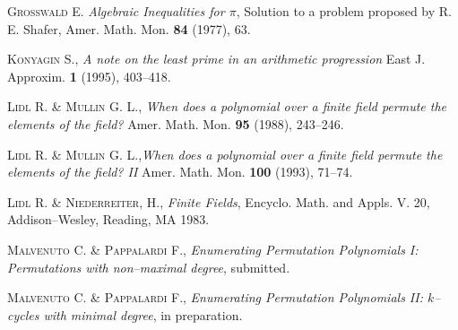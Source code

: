 \documentclass{amsart}
\begin{document}
    \begin{thebibliography}{99}

 \textsc{Grosswald E.}
\textit{Algebraic Inequalities for $\pi$}, Solution to a problem
proposed by R. E. Shafer, Amer. Math. Mon. \textbf{84} (1977), 63.

 \textsc{Konyagin S.},
\textit{A note on the least prime in an arithmetic progression}
East J. Approxim. \textbf{1} (1995), 403--418.

 \textsc{Lidl R. \& Mullin G. L.}, \textit{When does a polynomial over a finite field permute the elements of the field?} Amer. Math. Mon. \textbf{95} (1988), 243--246.

 \textsc{Lidl R. \& Mullin G. L.},\textit{When does a polynomial over a finite field permute the elements of the field? II} Amer. Math. Mon. \textbf{100} (1993), 71--74.

 \textsc{Lidl R. \& Niederreiter, H.}, \textit{Finite Fields}, Encyclo. Math. and Appls. V. 20, Addison--Wesley, Reading, MA 1983.

 \textsc{Malvenuto C. \& Pappalardi F.},
\textit{Enumerating Permutation Polynomials I: Permutations with
non--maximal degree}, submitted.

 \textsc{Malvenuto C. \& Pappalardi F.},
\textit{Enumerating Permutation Polynomials II: $k$--cycles with minimal degree}, in preparation.
\end{thebibliography}
\bigskip\bigskip
\end{document}
